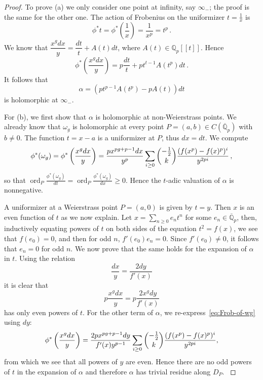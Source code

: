 \documentclass[11pt, a4paper]{amsart}
\newcommand{\Q}{\mathbb{Q}}
\newcommand{\ord}{\operatorname{ord}}
\theoremstyle{remark}
\numberwithin{equation}{section}
\newcommand{\sg}{{}}
\newcommand{\sm}{{}}
\begin{document}
\begin{proof}
To prove (a) we only consider one point at infinity, say $\infty_-$; the
  proof is the same for the other one. The action of Frobenius on the
  uniformizer $t=\frac{1}{x}$ is 
\[
\phi^* t=\phi^*\left(\dfrac{1}{x}\right)=\dfrac{1}{x^p}=t^p\,.
\]
We know that $\dfrac{x^gdx}{y}=\dfrac{dt}{t}+A(t) dt $, where $A(t)\in \Q_p[[t]]$.
Hence
\[
\phi^*\left(\dfrac{x^gdx}{y}\right)=p\dfrac{dt}{t}+pt^{t-1}A(t^p)dt\,.
\]
It follows that
\[
\alpha=(pt^{p-1}A(t^p)-pA(t))dt
\]
is holomorphic at $\infty_-$. 

For (b), we first show that $\alpha$ is holomorphic at non-Weierstrass
  points. We already know that \sg{$\omega_g$} is holomorphic at every point
  $P=(a,b)\in C(\overline{\Q}_p)$ with $b\neq 0$. The function $t=x-a$ is a uniformizer at $P$, thus $dx=dt$. We compute 
\begin{equation}\label{eq:Frob-of-wg}
 \sg{\phi^*(\omega_g)}=\phi^*\left(\dfrac{x^gdx}{y}\right)=\dfrac{px^{pg+p-1}dx}{y^p}\displaystyle\sum_{i\geq
  0}\dbinom{-\frac{1}{2}}{k}\dfrac{(f(x^p)-f(x)^p)^i}{y^{2pi}}\,,    
\end{equation}
so that  \sg{$\ord_P\frac{\phi^*(\omega_g)}{dt}=\ord_P\frac{\phi^*(\omega_g)}{dx}\geq 0$}.
Hence the $t$-adic valuation of $\alpha$ is nonnegative.

A uniformizer at a Weierstrass point $P=(a,0)$ is given by $t=y$. Then $x$ is an
  even function of $t$ as we now explain. Let $x=\sum_{n\geq 0} e_nt^n$ for
  some $e_n\in\overline{\Q}_p$, then, inductively equating powers of $t$ on
  both sides of the equation $t^2=f(x)$, we see that $f(e_0)=0$, and then for odd $n$, $f'(e_0)e_n=0$. Since $f'(e_0)\neq 0$, it follows that $e_n=0$ for odd $n$.
We now prove that the same holds for the expansion of $\alpha$ in $t$. Using the relation
$$\dfrac{dx}{y}=\dfrac{2dy}{f'(x)}$$
it is clear that 
$$p\dfrac{x^gdx}{y}=p\dfrac{2x^gdy}{f'(x)}$$
has only even powers of $t$. For the other term of $\alpha$, we
  re-express~\eqref{eq:Frob-of-wg} using $dy$:
$$\phi^*\left(\dfrac{x^gdx}{y}\right)=\dfrac{2px^{pg+p-1}dy}{f'(x)y^{p-1}}\displaystyle\sum_{i\geq 0}\dbinom{-\frac{1}{2}}{k}\dfrac{(f(x^p)-f(x)^p)^i}{y^{2pi}},$$
from which we see that all powers of $y$ are even. Hence there are no odd
  powers of $t$ in the expansion of $\alpha$ and therefore \sm{$\alpha$ has
  trivial residue along $D_P$. }
\end{proof}
\end{document}
